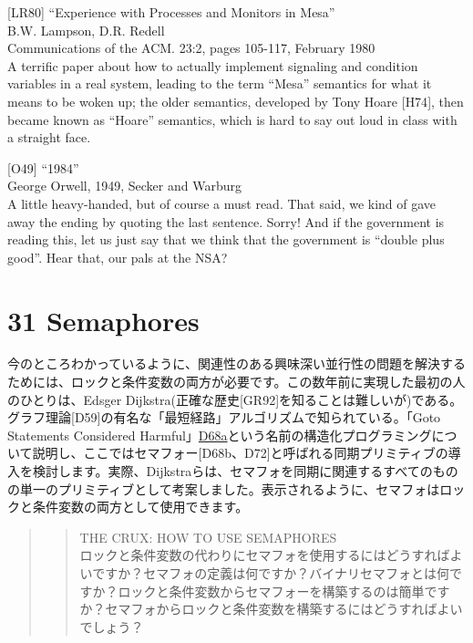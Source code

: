 {[}LR80{]} ``Experience with Processes and Monitors in Mesa''\\
B.W. Lampson, D.R. Redell\\
Communications of the ACM. 23:2, pages 105-117, February 1980\\
A terrific paper about how to actually implement signaling and condition
variables in a real system, leading to the term ``Mesa'' semantics for
what it means to be woken up; the older semantics, developed by Tony
Hoare {[}H74{]}, then became known as ``Hoare'' semantics, which is hard
to say out loud in class with a straight face.

{[}O49{]} ``1984''\\
George Orwell, 1949, Secker and Warburg\\
A little heavy-handed, but of course a must read. That said, we kind of
gave away the ending by quoting the last sentence. Sorry! And if the
government is reading this, let us just say that we think that the
government is ``double plus good''. Hear that, our pals at the NSA?

\hypertarget{semaphores}{%
\section*{31 Semaphores}\label{semaphores}}

今のところわかっているように、関連性のある興味深い並行性の問題を解決するためには、ロックと条件変数の両方が必要です。この数年前に実現した最初の人のひとりは、Edsger
Dijkstra(正確な歴史{[}GR92{]}を知ることは難しいが)である。グラフ理論{[}D59{]}の有名な「最短経路」アルゴリズムで知られている。「Goto
Statements Considered
Harmful」\href{これはすばらしいタイトルです}{D68a}という名前の構造化プログラミングについて説明し、ここではセマフォー{[}D68b、D72{]}と呼ばれる同期プリミティブの導入を検討します。実際、Dijkstraらは、セマフォを同期に関連するすべてのものの単一のプリミティブとして考案しました。表示されるように、セマフォはロックと条件変数の両方として使用できます。

\begin{quote}
\begin{quote}
THE CRUX: HOW TO USE SEMAPHORES\\
ロックと条件変数の代わりにセマフォを使用するにはどうすればよいですか？セマフォの定義は何ですか？バイナリセマフォとは何ですか？ロックと条件変数からセマフォーを構築するのは簡単ですか？セマフォからロックと条件変数を構築するにはどうすればよいでしょう？
\end{quote}
\end{quote}

